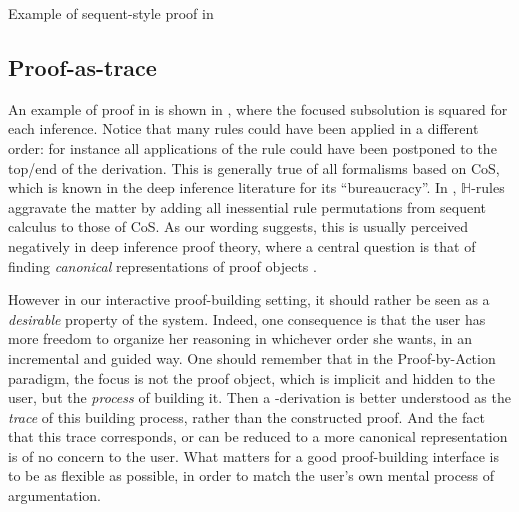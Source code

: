 \begin{marginfigure}
  
  \caption{Example of sequent-style proof in }
\end{marginfigure}

\subsection{Proof-as-trace}

An example of proof in  is shown in , where the
focused subsolution is squared for each inference. Notice that many rules could
have been applied in a different order: for instance all applications of the
{} rule could have been postponed to the top/end of the derivation.
This is generally true of all formalisms based on CoS, which is known in the
deep inference literature for its ``bureaucracy''. In ,
$\mathbb{H}$-rules aggravate the matter by adding all inessential rule
permutations from sequent calculus to those of CoS. As our wording suggests,
this is usually perceived negatively in deep inference proof theory, where a
central question is that of finding \emph{canonical} representations of proof
objects .

However in our interactive proof-building setting, it should rather be seen as a
\emph{desirable} property of the system. Indeed, one consequence is that the
user has more freedom to organize her reasoning in whichever order she wants, in
an incremental and guided way. One should remember that in the Proof-by-Action
paradigm, the focus is not the proof object, which is implicit and hidden to the
user, but the \emph{process} of building it. Then a -derivation is
better understood as the \emph{trace} of this building process, rather than the
constructed proof. And the fact that this trace corresponds, or
can be reduced to a more canonical representation is of no concern to the user.
What matters for a good proof-building interface is to be as flexible as
possible, in order to match the user's own mental process of argumentation.

